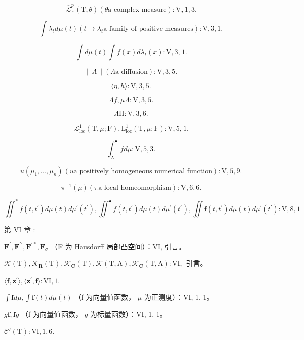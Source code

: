 \[
\overline {{\mathcal {L}}} _ {\mathrm{F}} ^ {p} (\mathrm{T}, \theta) (\theta \text {a complex measure}): \mathrm{V,1,3.}
\]

\[
\int \lambda_ {t} d \mu (t) (t \mapsto \lambda_ {t} \text {a family of positive measures}): \mathrm{V}, 3, 1.
\]

\[
\int d \mu (t) \int f (x) d \lambda_ {t} (x): \mathrm{V}, 3, 1.
\]

\[
\| \Lambda \| (\Lambda \text {a diffusion}): \mathrm{V}, 3, 5.
\]

\[
\langle \eta , h \rangle : \mathrm{V}, 3, 5.
\]

\[
\Lambda f, \mu \Lambda : \mathrm{V}, 3, 5.
\]

\[
\Lambda \mathrm{H}: \mathrm{V}, 3, 6.
\]

\[
\mathcal {L} _ {\mathrm{loc}} ^ {1} (\mathrm{T}, \mu ; \mathrm{F}), \mathrm{L} _ {\mathrm{loc}} ^ {1} (\mathrm{T}, \mu ; \mathrm{F}): \mathrm{V}, 5, 1.
\]

\[
\int_ {\mathrm{A}} ^ {\bullet} f d \mu : \mathrm{V}, 5, 3.
\]

\[
u (\mu_ {1}, \dots , \mu_ {n}) (u \text {a positively homogeneous numerical function}): \mathrm{V}, 5, 9.
\]

\[
\pi^ {- 1} (\mu) (\pi \text {a local homeomorphism}) \colon \mathrm{V,6,6.}
\]

\[
\iint^ {*} f (t, t ^ {\prime}) d \mu (t) d \mu^ {\prime} (t ^ {\prime}), \iint^ {\bullet} f (t, t ^ {\prime}) d \mu (t) d \mu^ {\prime} (t ^ {\prime}), \iint \mathbf {f} (t, t ^ {\prime}) d \mu (t) d \mu^ {\prime} (t ^ {\prime}): \mathrm{V}, 8, 1
\]

第 VI 章 :

\(\mathbf{F}^{\prime},\mathbf{F}^{\prime \prime},\mathbf{F}^{\prime *},\mathbf{F}_{\sigma}\) （F 为 Hausdorff 局部凸空间）：VI, 引言。

\(\mathcal{K}(\mathrm{T}),\mathcal{K}_{\mathbf{R}}(\mathrm{T}),\mathcal{K}_{\mathbf{C}}(\mathrm{T}),\mathcal{K}(\mathrm{T},\mathrm{A}),\mathcal{K}_{\mathbf{C}}(\mathrm{T},\mathrm{A}):\mathrm{VI},\) 引言。

\(\langle \mathbf{f},\mathbf{z}^{\prime}\rangle ,\langle \mathbf{z}^{\prime},\mathbf{f}\rangle :\mathrm{VI},1.\)

\(\int \mathbf{f} d\mu, \int \mathbf{f}(t) d\mu(t)\) （f 为向量值函数， \(\mu\) 为正测度）：VI, 1, 1。

\(g\mathbf{f},\mathbf{f}g\) （f 为向量值函数， \(g\) 为标量函数）：VI, 1, 1。

\(\mathcal{C}'(\mathrm{T}) : \mathrm{VI}, 1, 6.\)

